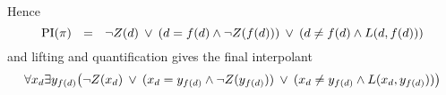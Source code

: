 \begin{exa}
{\begin{prooftree}

			\AxiomCm{ \bot }


		\end{prooftree}
	}


	\noindent
	Hence
	\[\operatorname{PI}(\pi) \ \ = \ \   \lnot Z(d) \;\,{\lor}\;\,  (d = f(d) \land \lnot Z(f(d)) ) \;\,{\lor}\;\, (d \neq f(d) \land L(d, f(d))) \]
	and lifting and quantification gives the final interpolant
	\[ \forall x_d \exists y_{f(d)} \big( \lnot Z(x_d) \;\,{\lor}\;\,  (x_d = y_{f(d)} \land \lnot Z(y_{f(d)}) ) \;\,{\lor}\;\, (x_d \neq y_{f(d)} \land L(x_d, y_{f(d)})) \big)\]
	\qedhere





	\begin{comment}
		\begin{prooftree}


			\AxiomCm{ G(x, y) \lor L(x, y) \lor x = y \mid \bot }
			\AxiomCm{ \lnot Z(z) \lor \lnot  L(z, u) \mid \top}
			\BinaryInfCm{  G(x, y) \lor x=y \lor \lnot Z(x) \mid (L(x,y) \land \top) \lor (\lnot L(x,y) \land \bot)}
			\noLine
			\UnaryInfCm{  G(x, y) \lor x=y \lor \lnot Z(x) \mid L(x,y)}

			\AxiomCm{ \lnot Z(w) \lor \lnot Z(f(w)) \mid \bot }
			\AxiomCm{ Z(d)\mid \top}
			\BinaryInfCm{ \lnot Z(f(d)) \mid Z(d) \markC  \hl{error}}

			\BinaryInfCm{ G(x, f(d)) \lor \lnot Z(x) \lor \lnot Z(y) \mid (x=f(d) \land Z(d)) \lor (x\neq f(d) \land L(x, f(d))) }
			\UnaryInfCm{ G(x, f(d)) \lor \lnot Z(x)  \mid (x=f(d) \land Z(d)) \lor (x\neq f(d) \land L(x, f(d))) }

			\AxiomCm{ \lnot G(v, f(v)) \mid \bot}

			\BinaryInfCm{  \lnot Z(d)  \mid (d=f(d) \land Z(d)) \lor (d\neq f(d) \land L(d, f(d))) \markC }

			\AxiomCm{ Z(d) \mid \bot }

			\BinaryInfCm{  \square \mid Z(d) \land (  (d=f(d) \land Z(d)) \lor (d\neq f(d) \land L(d, f(d))) ) \markC }



		\end{prooftree}
	\end{comment}


\end{exa}

